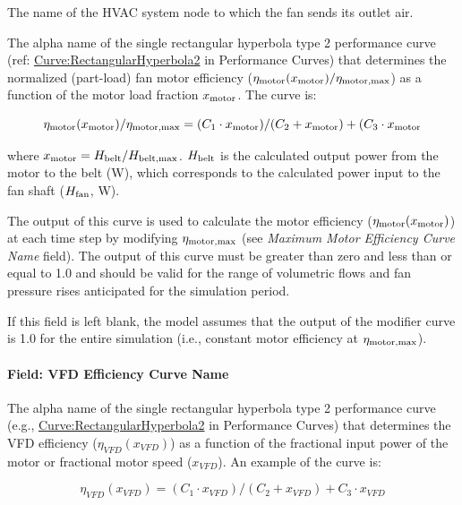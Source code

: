The name of the HVAC system node to which the fan sends its outlet air.

The alpha name of the single rectangular hyperbola type 2 performance curve (ref: \hyperref[curverectangularhyperbola2]{Curve:RectangularHyperbola2} in Performance Curves) that determines the normalized (part-load) fan motor efficiency (\(\eta_{\rm{motor}} (x_{\rm{motor}}) /  \eta_{\rm{motor, max}}\)) as a function of the motor load fraction \(x_{\rm{motor}}\). The curve is:

\begin{equation}
  \eta_{\rm{motor}} (x_{\rm{motor}}) / \eta_{\rm{motor, max}} = (C_1 \cdot x_{\rm{motor}}) / (C_2 + x_{\rm{motor}}) + (C_3 \cdot x_{\rm{motor}}
\end{equation}

where \(x_{\rm{motor}} = H_{\rm{belt}} / H_{\rm{belt, max}}\). \(H_{\rm{belt}}\) is the calculated output power from the motor to the belt (W), which corresponds to the calculated power input to the fan shaft (\(H_{\rm{fan}}\), W).

  The output of this curve is used to calculate the motor efficiency (\(\eta_{\rm{motor}} (x_{\rm{motor}})\)) at each time step by modifying \(\eta_{\rm{motor, max}}\) (see \emph{Maximum Motor Efficiency Curve Name} field). The output of this curve must be greater than zero and less than or equal to 1.0 and should be valid for the range of volumetric flows and fan pressure rises anticipated for the simulation period.

If this field is left blank, the model assumes that the output of the modifier curve is 1.0 for the entire simulation (i.e., constant motor efficiency at \(\eta_{\rm{motor, max}}\)).

\paragraph{Field: VFD Efficiency Curve Name}\label{field-vfd-efficiency-curve-name}

The alpha name of the single rectangular hyperbola type 2 performance curve (e.g., \hyperref[curverectangularhyperbola2]{Curve:RectangularHyperbola2} in Performance Curves) that determines the VFD efficiency (\(\eta_{VFD}(x_{VFD})\)) as a function of the fractional input power of the motor or fractional motor speed (\(x_{VFD}\)). An example of the curve is:

\begin{equation}
  \eta_{VFD}(x_{VFD}) = (C_1 \cdot x_{VFD}) / (C_2 + x_{VFD}) + C_3 \cdot x_{VFD}
\end{equation}

